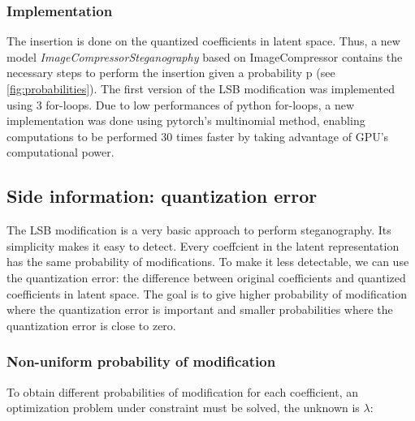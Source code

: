 \documentclass[12pt]{article}
\begin{document}
\subsubsection{Implementation}
The insertion is done on the quantized coefficients in latent space. Thus, a new model \textit{ImageCompressorSteganography} based on ImageCompressor contains the necessary steps to perform the insertion given a probability p (see \autoref{fig:probabilities}). The first version of the LSB modification was implemented using 3 for-loops. Due to low performances of python for-loops, a new implementation was done using pytorch's multinomial method, enabling computations to be performed 30 times faster by taking advantage of GPU's computational power.

\subsection{Side information: quantization error}
The LSB modification is a very basic approach to perform steganography. Its simplicity makes it easy to detect. Every coeffcient in the latent representation has the same probability of modifications. To make it less detectable, we can use the quantization error: the difference between original coefficients and quantized coefficients in latent space. The goal is to give higher probability of modification where the quantization error is important and smaller probabilities where the quantization error is close to zero.  
\subsubsection{Non-uniform probability of modification}
To obtain different probabilities of modification for each coefficient, an optimization problem under constraint must be solved, the unknown is $\lambda$:
\end{document}
